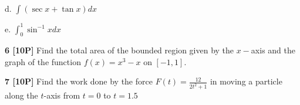 \documentclass[12pt]{article}
\begin{document}

d.  ${\displaystyle \int (\sec x+\tan x) dx }$


e. ${\displaystyle \int_0^1 \sin^{-1} x dx}$


{\bf 6 [10P]} Find the total area of the bounded region given by the
${\displaystyle x-}$axis and the graph of the function
${\displaystyle f(x) = x^3-x }$ on $[-1,1]$.

 





{\bf 7 [10P]} Find the work done by the force $
F(t) = \frac{12}{2t^2+1}$
in moving a particle along the $t$-axis from $t=0$ to $t=1.5$



\end{document}
